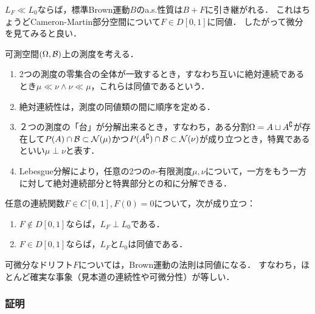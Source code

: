 \documentclass[uplatex,dvipdfmx]{jsreport}
\begin{document}
\begin{tcolorbox}[colframe=ForestGreen, colback=ForestGreen!10!white,breakable,colbacktitle=ForestGreen!40!white,coltitle=black,fonttitle=\bfseries\sffamily,
title=]
    $L_F\ll L_0$ならば，標準Brown運動$B$のa.s.性質は$B+F$に引き継がれる．
    これはちょうどCameron-Martin部分空間について$F\in D[0,1]$に同値．
    したがって微分を見てみると良い．
\end{tcolorbox}

\begin{definition}
    可測空間$(\Omega,\mathcal{B})$上の測度を考える．
    \begin{enumerate}
        \item 2つの測度の零集合の全体が一致するとき，すなわち互いに絶対連続であるとき$\mu\ll\nu\land\nu\ll\mu$，これらは同値であるという．
        \item 絶対連続性は，測度の同値類の間に順序を定める．
        \item ２つの測度の「台」が分解出来るとき，すなわち，ある分割$\Omega=A\sqcup A^\complement$が存在して$P(A)\cap\mathcal{B}\subset\mathcal{N}(\mu)$かつ$P(A^\complement)\cap\mathcal{B}\subset\mathcal{N}(\nu)$が成り立つとき，特異であるといい$\mu\perp\nu$と表す．
        \item Lebesgue分解により，任意の2つの$\sigma$-有限測度$\mu,\nu$について，一方をもう一方に対して絶対連続部分と特異部分との和に分解できる．
    \end{enumerate}
\end{definition}

\begin{theorem}
    任意の連続関数$F\in C[0,1],F(0)=0$について，次が成り立つ：
    \begin{enumerate}
        \item $F\notin D[0,1]$ならば，$L_F\perp L_0$である．
        \item $F\in D[0,1]$ならば，$L_F$と$L_0$は同値である．
    \end{enumerate}
\end{theorem}
\begin{remarks}
    可微分なドリフト$F$については，Brown運動の法則は同値になる．
    すなわち，ほとんど確実な事象（見本道の連続性や可微分性）が等しい．
\end{remarks}

\subsubsection{証明}
\end{document}
